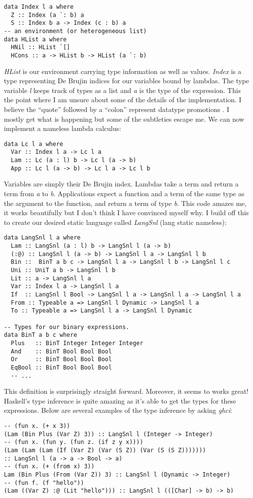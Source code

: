\documentclass{article}
\begin{document}
\begin{verbatim}
data Index l a where
  Z :: Index (a `: b) a
  S :: Index b a -> Index (c : b) a
-- an environment (or heterogeneous list)
data HList a where
  HNil :: HList `[]
  HCons :: a -> HList b -> HList (a `: b)
\end{verbatim}
\textit{HList} is our environment carrying type information as well as values. \textit{Index} is a type representing De Brujin indices for our variables bound by lambdas. The type variable \textit{l} keeps track of types as a list and \textit{a} is the type of the expression. This the point where I am unsure about some of the details of the implementation. I believe the ``quote'' followed by a ``colon'' represent datatype promotions \cite{promotion}. I mostly get what is happening but some of the subtleties escape me. We can now implement a nameless lambda calculus:
\begin{verbatim}
data Lc l a where
  Var :: Index l a -> Lc l a
  Lam :: Lc (a : l) b -> Lc l (a -> b)
  App :: Lc l (a -> b) -> Lc l a -> Lc l b
\end{verbatim}
Variables are simply their De Brujin index. Lambdas take a term and return a term from \textit{a} to \textit{b}. Applications expect a function and a term of the same type as the argument to the function, and return a term of type \textit{b}. This code amazes me, it works beautifully but I don't think I have convinced myself why. I build off this to create our desired static language called \textit{LangSnl} (lang static nameless):
\begin{verbatim}
data LangSnl l a where
  Lam :: LangSnl (a : l) b -> LangSnl l (a -> b)
  (:@) :: LangSnl l (a -> b) -> LangSnl l a -> LangSnl l b
  Bin ::  BinT a b c -> LangSnl l a -> LangSnl l b -> LangSnl l c
  Uni :: UniT a b -> LangSnl l b
  Lit :: a -> LangSnl l a
  Var :: Index l a -> LangSnl l a
  If  :: LangSnl l Bool -> LangSnl l a -> LangSnl l a -> LangSnl l a
  From :: Typeable a => LangSnl l Dynamic -> LangSnl l a
  To :: Typeable a => LangSnl l a -> LangSnl l Dynamic

-- Types for our binary expressions.
data BinT a b c where
  Plus   :: BinT Integer Integer Integer
  And    :: BinT Bool Bool Bool
  Or     :: BinT Bool Bool Bool
  EqBool :: BinT Bool Bool Bool
  -- ...

\end{verbatim}
This definition is surprisingly straight forward. Moreover, it seems to works great! Haskell's type inference is quite amazing as it's able to get the types for these expressions. Below are several examples of the type inference by asking \textit{ghci}:
\begin{verbatim}
-- (fun x. (+ x 3))
(Lam (Bin Plus (Var Z) 3)) :: LangSnl l (Integer -> Integer)
-- (fun x. (fun y. (fun z. (if z y x))))
(Lam (Lam (Lam (If (Var Z) (Var (S Z)) (Var (S (S Z)))))))
:: LangSnl l (a -> a -> Bool -> a)
-- (fun x. (+ (from x) 3))
Lam (Bin Plus (From (Var Z)) 3) :: LangSnl l (Dynamic -> Integer)
-- (fun f. (f "hello"))
(Lam ((Var Z) :@ (Lit "hello"))) :: LangSnl l (([Char] -> b) -> b)
\end{verbatim}
\end{document}
